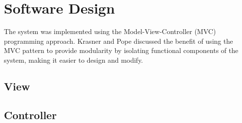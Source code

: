 \section{Software Design}

The system was implemented using the Model-View-Controller (MVC) programming approach. Krasner and Pope\autocite{krasner-pope-88} discussed the benefit of using the MVC pattern to provide modularity by isolating functional components of the system, making it easier to design and modify.


 \subsection{View}
 \subsection{Controller}